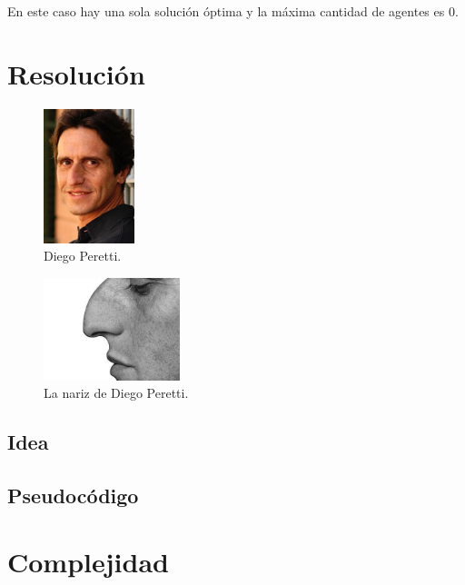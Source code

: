 \documentclass[10pt, a4paper]{article}
\begin{document}
		En este caso hay una sola soluci\'on \'optima y la m\'axima cantidad de agentes es 0.


\section{Resoluci\'on}

	\begin{figure}[H]
		\includegraphics[width=100px]{peretti.jpg}
		\caption{Diego Peretti.}
		\label{peretti}
	\end{figure}
	
	\begin{figure}[H]
		\includegraphics[width=150px]{nariz.jpg}
		\caption{La nariz de Diego Peretti.}
		\label{nariz}
	\end{figure}
	
	\subsection{Idea}
	
	\subsection{Pseudoc\'odigo}

\section{Complejidad}
\end{document}
